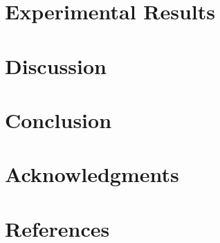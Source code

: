 \documentclass[a4paper]{jpconf}
\begin{document}
\section{Experimental Results}

\section{Discussion}

\section{Conclusion}

\section*{Acknowledgments}

\section*{References}


\end{document}
